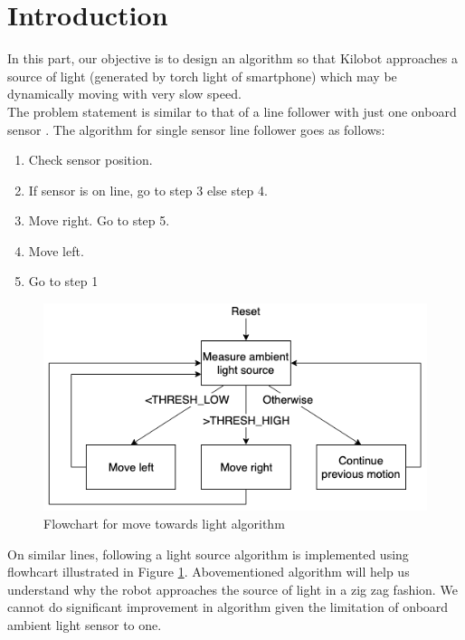 \section{Introduction}
In this part, our objective is to design an algorithm so that Kilobot approaches a source of light (generated by torch light of smartphone) which may be dynamically moving with very slow speed.\\
The problem statement is similar to that of a line follower with just one onboard sensor \cite{simple-line-follower}. The algorithm for single sensor line follower goes as follows:
\begin{enumerate}
	\item Check sensor position.
	\item If sensor is on line, go to step 3 else step 4.
	\item Move right. Go to step 5.
	\item Move left.
	\item Go to step 1
\end{enumerate}
\begin{figure}[H]
	\centering
	\includegraphics[scale=0.5]{images/move_towards_light_algorithm}
	\caption{Flowchart for move towards light algorithm}
	\label{fig:move_towards_light_algorithm}
\end{figure}
On similar lines, following a light source algorithm is implemented using flowhcart illustrated in Figure \ref{fig:move_towards_light_algorithm}.
Abovementioned algorithm will help us understand why the robot approaches the source of light in a zig zag fashion. We cannot do significant improvement in algorithm given the limitation of onboard ambient light sensor to one.
